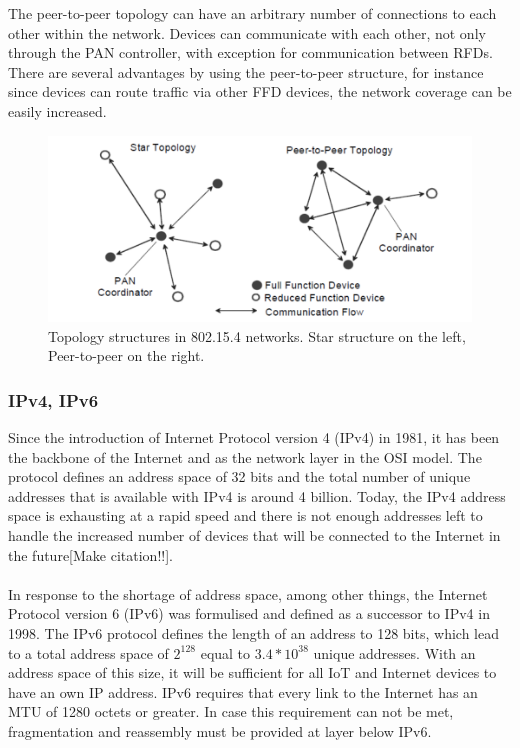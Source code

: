 The peer-to-peer topology can have an arbitrary number of connections to each other within the network. Devices can communicate with each other, not only through the PAN controller, with exception for communication between RFDs. There are several advantages by using the peer-to-peer structure, for instance since devices can route traffic via other FFD devices, the network coverage can be easily increased.\\


\begin{figure}
	\includegraphics[width=\textwidth]{figures/802-15-4-topologies.png}
	\caption{Topology structures in 802.15.4 networks. Star structure on the left, Peer-to-peer on the right.}
	\label{fig:topology}
\end{figure}


\subsubsection{IPv4, IPv6}
Since the introduction of Internet Protocol version 4 (IPv4) in 1981\cite{rfc791}, it has been the backbone of the Internet and as the network layer in the OSI model. The protocol defines an address space of 32 bits and the total number of unique addresses that is available with IPv4 is around 4 billion. Today, the IPv4 address space is exhausting at a rapid speed and there is not enough addresses left to handle the increased number of devices that will be connected to the Internet in the future[Make citation!!].
\\\\
In response to the shortage of address space, among other things, the Internet Protocol version 6 (IPv6) was formulised and defined as a successor to IPv4 in 1998\cite{rfc2460}. The IPv6 protocol defines the length of an address to 128 bits, which lead to a total address space of ${2^{128}}$ equal to ${3.4*10^{38}}$ unique addresses. With an address space of this size, it will be sufficient for all IoT and Internet devices to have an own IP address. IPv6 requires that every link to the Internet has an MTU of 1280 octets or greater. In case this requirement can not be met,  fragmentation and reassembly must be provided at layer below IPv6\cite{rfc2460}.


